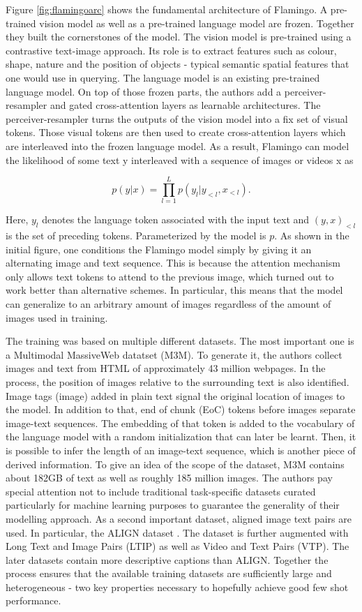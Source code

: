 \documentclass[
]{krantz}
\begin{document}
Figure \ref{fig:flamingoarc} shows the fundamental architecture of Flamingo. A pre-trained vision model as well as a pre-trained language model are frozen. Together they built the cornerstones of the model. The vision model is pre-trained using a contrastive text-image approach. Its role is to extract features such as colour, shape, nature and the position of objects - typical semantic spatial features that one would use in querying. The language model is an existing pre-trained language model. On top of those frozen parts, the authors add a perceiver-resampler and gated cross-attention layers as learnable architectures. The perceiver-resampler turns the outputs of the vision model into a fix set of visual tokens. Those visual tokens are then used to create cross-attention layers which are interleaved into the frozen language model. As a result, Flamingo can model the likelihood of some text y interleaved with a sequence of images or videos x as

\[p(y|x) = \prod_{l=1}^{L} p(y_l | y_{<l}, x_{<l}).\]

Here, \(y_l\) denotes the language token associated with the input text and \((y,x)_{<l}\) is the set of preceding tokens. Parameterized by the model is \(p\). As shown in the initial figure, one conditions the Flamingo model simply by giving it an alternating image and text sequence. This is because the attention mechanism only allows text tokens to attend to the previous image, which turned out to work better than alternative schemes. In particular, this means that the model can generalize to an arbitrary amount of images regardless of the amount of images used in training.

The training was based on multiple different datasets. The most important one is a Multimodal MassiveWeb datatset (M3M). To generate it, the authors collect images and text from HTML of approximately 43 million webpages. In the process, the position of images relative to the surrounding text is also identified. Image tags (image) added in plain text signal the original location of images to the model. In addition to that, end of chunk (EoC) tokens before images separate image-text sequences. The embedding of that token is added to the vocabulary of the language model with a random initialization that can later be learnt. Then, it is possible to infer the length of an image-text sequence, which is another piece of derived information. To give an idea of the scope of the dataset, M3M contains about 182GB of text as well as roughly 185 million images. The authors pay special attention not to include traditional task-specific datasets curated particularly for machine learning purposes to guarantee the generality of their modelling approach. As a second important dataset, aligned image text pairs are used. In particular, the ALIGN dataset \citep{jia2021scaling}. The dataset is further augmented with Long Text and Image Pairs (LTIP) as well as Video and Text Pairs (VTP). The later datasets contain more descriptive captions than ALIGN. Together the process ensures that the available training datasets are sufficiently large and heterogeneous - two key properties necessary to hopefully achieve good few shot performance.
\end{document}
